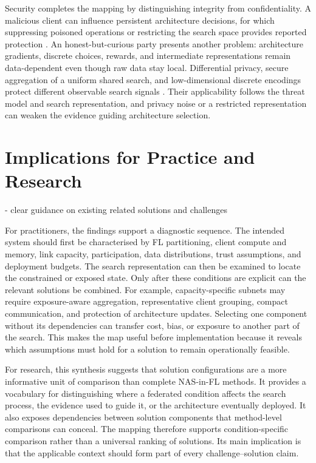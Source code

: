 Security completes the mapping by distinguishing integrity from confidentiality. A malicious client can influence persistent architecture decisions, for which suppressing poisoned operations or restricting the search space provides reported protection \cite{privacy_preserving_fednas_for_edge_2025}. An honest-but-curious party presents another problem: architecture gradients, discrete choices, rewards, and intermediate representations remain data-dependent even though raw data stay local. Differential privacy, secure aggregation of a uniform shared search, and low-dimensional discrete encodings protect different observable search signals \cite{dp-fnas_2020,feathers_2023,multi-granular_fednas_2023}. Their applicability follows the threat model and search representation, and privacy noise or a restricted representation can weaken the evidence guiding architecture selection.

\section{Implications for Practice and Research}

- clear guidance on existing related solutions and challenges

For practitioners, the findings support a diagnostic sequence. The intended system should first be characterised by FL partitioning, client compute and memory, link capacity, participation, data distributions, trust assumptions, and deployment budgets. The search representation can then be examined to locate the constrained or exposed state. Only after these conditions are explicit can the relevant solutions be combined. For example, capacity-specific subnets may require exposure-aware aggregation, representative client grouping, compact communication, and protection of architecture updates. Selecting one component without its dependencies can transfer cost, bias, or exposure to another part of the search. This makes the map useful before implementation because it reveals which assumptions must hold for a solution to remain operationally feasible.

For research, this synthesis suggests that solution configurations are a more informative unit of comparison than complete NAS-in-FL methods. It provides a vocabulary for distinguishing where a federated condition affects the search process, the evidence used to guide it, or the architecture eventually deployed. It also exposes dependencies between solution components that method-level comparisons can conceal. The mapping therefore supports condition-specific comparison rather than a universal ranking of solutions. Its main implication is that the applicable context should form part of every challenge--solution claim.

